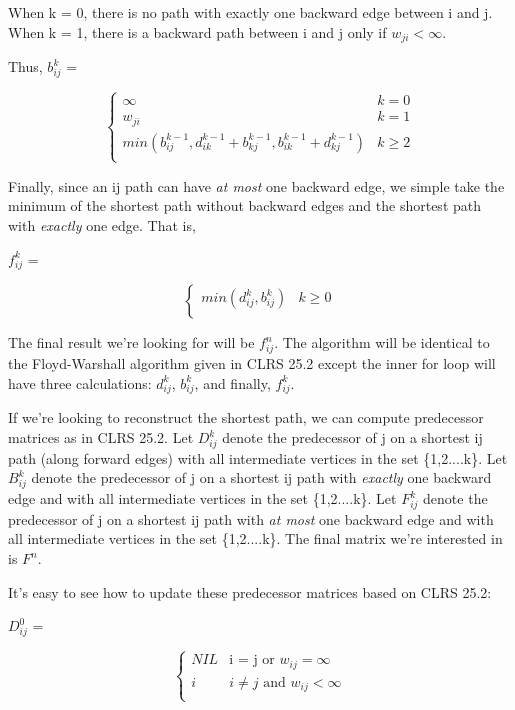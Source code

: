 \documentclass[11pt,a4paper]{article}
\begin{document}
When k = 0, there is no path with exactly one backward edge between i and j. When k = 1, there is a backward path between i and j only if $w_{ji} < \infty$.

Thus, $b_{ij}^{k}$ = 

\[ \begin{cases} 
      \infty & k = 0 \\
      w_{ji} & k = 1 \\
      min(b_{ij}^{k-1}, d_{ik}^{k-1} + b_{kj}^{k-1}, b_{ik}^{k-1} + d_{kj}^{k-1}) & k \geq 2 \\
   \end{cases}
\]

Finally, since an ij path can have \textit{at most} one backward edge, we simple take the minimum of the shortest path without backward edges and the shortest path with \textit{exactly} one edge. That is,

$f_{ij}^{k}$ = 

\[ \begin{cases} 
      min(d_{ij}^{k}, b_{ij}^{k}) & k \geq 0 \\
   \end{cases}
\]

The final result we're looking for will be $f_{ij}^{n}$. The algorithm will be identical to the Floyd-Warshall algorithm given in CLRS 25.2 except the inner for loop will have three calculations: $d_{ij}^{k}$, $b_{ij}^{k}$, and finally, $f_{ij}^{k}$.

If we're looking to reconstruct the shortest path, we can compute predecessor matrices as in CLRS 25.2. Let $D_{ij}^{k}$ denote the predecessor of j on a shortest ij path (along forward edges) with all intermediate vertices in the set \{1,2....k\}. Let $B_{ij}^{k}$ denote the predecessor of j on a shortest ij path with \textit{exactly} one backward edge and with all intermediate vertices in the set \{1,2....k\}. Let $F_{ij}^{k}$ denote the predecessor of j on a shortest ij path with \textit{at most} one backward edge and with all intermediate vertices in the set \{1,2....k\}. The final matrix we're interested in is $F^{n}$.

It's easy to see how to update these predecessor matrices based on CLRS 25.2:

$D_{ij}^{0}$ = 

\[ \begin{cases} 
      NIL & \text{i = j or }w_{ij} = \infty \\
      i & i \neq j\text{ and }w_{ij} < \infty \\
   \end{cases}
\]
\end{document}

